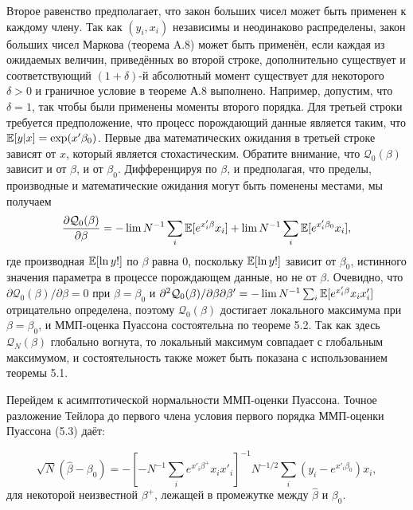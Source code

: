 Второе равенство предполагает, что закон больших чисел может быть применен к каждому члену. Так как $(y_i,x_i)$ независимы и неодинаково распределены, закон больших чисел Маркова (теорема A.8) может быть применён, если каждая из ожидаемых величин, приведённых во второй строке, дополнительно существует и соответствующий $(1+\delta)$-й абсолютный момент существует для некоторого $\delta>0$ и граничное условие в теореме А.8 выполнено. Например, допустим, что $\delta=1$, так чтобы были применены моменты второго порядка. Для третьей строки требуется предположение, что процесс порождающий данные является таким, что $\mathbb{E}[y|x]=\exp(x'\beta_0)$. Первые два математических ожидания в третьей строке зависят от $x$, который является стохастическим. Обратите внимание, что $\mathcal{Q}_0(\beta)$ зависит и от $\beta$, и от $\beta_0$. Дифференцируя по $\beta$, и предполагая, что пределы, производные и математические ожидания могут быть поменены местами, мы получаем
\[
\frac{\partial \mathcal{Q}_0(\beta)}{\partial \beta}= -\lim N^{-1} \sum_i \mathbb{E}[e^{x'_i \beta} x_i] + \lim N^{-1} \sum_i \mathbb{E}[e^{x'_i \beta_0} x_i],
\]
где производная $\mathbb{E}[\ln y!]$ по $\beta$ равна 0, поскольку $\mathbb{E}[\ln y!]$ зависит от $\beta_0$, истинного значения параметра в процессе порождающем данные, но не от $\beta$. Очевидно, что $\partial \mathcal{Q}_0(\beta)/ \partial \beta=0$ при $\beta=\beta_0$ и $\partial^2 \mathcal{Q}_0(\beta) / \partial \beta \partial \beta' = -\lim N^{-1} \sum_i \mathbb{E}[e^{x'_i \beta} x_i x'_i]$ отрицательно определена, поэтому $\mathcal{Q}_0(\beta)$ достигает локального максимума при $\beta=\beta_0$, и ММП-оценка Пуассона состоятельна по теореме 5.2. Так как здесь $\mathcal{Q}_N(\beta)$ глобально вогнута, то локальный максимум совпадает с глобальным максимумом, и состоятельность также может быть показана с использованием теоремы 5.1.

Перейдем к асимптотической нормальности ММП-оценки Пуассона. Точное  разложение Тейлора до первого члена условия первого порядка ММП-оценки Пуассона (5.3) даёт:

\begin{equation}
\sqrt{N}(\hat{\beta}-\beta_0)=-\left[-N^{-1} \sum_i e^{x'_i \beta^+} x_i x'_i \right]^{-1} N^{-1/2} \sum_i (y_i-e^{x'_i \beta_0}) x_i,
\end{equation}
для некоторой неизвестной $\beta^+$, лежащей в промежутке между $\hat{\beta}$ и $\beta_0$.

